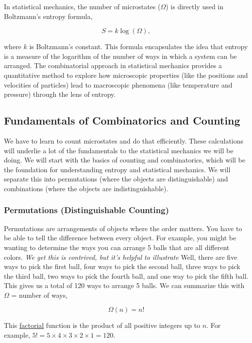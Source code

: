 In statistical mechanics, the number of microstates (\(\Omega\)) is
directly used in Boltzmann's entropy formula,

\[S = k \log(\Omega),\]

where \(k\) is Boltzmann's constant. This formula encapsulates the idea
that entropy is a measure of the logarithm of the number of ways in
which a system can be arranged. The combinatorial approach in
statistical mechanics provides a quantitative method to explore how
microscopic properties (like the positions and velocities of particles)
lead to macroscopic phenomena (like temperature and pressure) through
the lens of entropy.

\subsection{Fundamentals of Combinatorics and
Counting}\label{fundamentals-of-combinatorics-and-counting}

We have to learn to count microstates and do that efficiently. These
calculations will underlie a lot of the fundamentals to the statistical
mechanics we will be doing. We will start with the basics of counting
and combinatorics, which will be the foundation for understanding
entropy and statistical mechanics. We will separate this into
permutations (where the objects are distinguishable) and combinations
(where the objects are indistinguishable).

\subsubsection{Permutations (Distinguishable
Counting)}\label{permutations-distinguishable-counting}

Permutations are arrangements of objects where the order matters. You
have to be able to tell the difference between every object. For
example, you might be wanting to determine the ways you can arrange 5
balls that are all different colors. \emph{We get this is contrived, but
it's helpful to illustrate} Well, there are five ways to pick the first
ball, four ways to pick the second ball, three ways to pick the third
ball, two ways to pick the fourth ball, and one way to pick the fifth
ball. This gives us a total of 120 ways to arrange 5 balls. We can
summarize this with \(\Omega\) = number of ways,

\[\Omega(n) = n!\]

This \href{https://en.wikipedia.org/wiki/Factorial}{factorial} function
is the product of all positive integers up to \(n\). For example,
\(5! = 5 \times 4 \times 3 \times 2 \times 1 = 120\).

